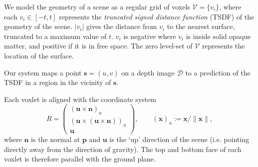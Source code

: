 \documentclass[10pt,twocolumn,letterpaper]{article}
\makeatletter
\renewcommand*{\ie}{i.e.\@\xspace}
\newcommand{\rgbdimage}{\mathcal{D}}
\newcommand{\intrinsics}{K}
\newcommand{\pixelidx}{\mathbf{s}}
\newcommand{\voxelgrid}{\mathcal{V}}
\newcommand{\voxel}{v}
\newcommand{\voxidx}{i}
\newcommand{\voxelidxs}{m, n, l}
\newcommand{\point}{\mathbf{p}}
\newcommand{\normal}{\mathbf{n}}
\newcommand{\updir}{\mathbf{u}}
\newcommand{\trans}{T}
\newcommand{\extrinsics}{H}
\newcommand{\voxelgridtoworld}{\trans_{\voxelgrid \rightarrow w}}
\makeatother
\begin{document}
We model the geometry of a scene as a regular grid of voxels $\voxelgrid = \{\voxel_\voxidx\}$, where each $\voxel_\voxidx \in [-t, t]$ represents the \emph{truncated signed distance function} (TSDF) of the geometry of the scene. $|\voxel_\voxidx|$ gives the distance from $\voxel_\voxidx$ to the nearest surface, truncated to a maximum value of $t$. $\voxel_\voxidx$ is negative where $\voxel_\voxidx$ is inside solid opaque matter, and positive if it is in free space. The zero level-set of $\voxelgrid$ represents the location of the surface.

Our system maps a point $\pixelidx = (u, v)$ on a depth image $\rgbdimage$ to a prediction of the TSDF in a region in the vicinity of $\pixelidx$.


Each voxlet is aligned with the coordinate system
\begin{equation}
  R = 
  \left( \begin{array}{ccc}
  (\updir \times \normal)_{u} \\
  (\updir \times (\updir \times \normal)  )_{u} \\
  \updir 
  \end{array}\right), \qquad
  (\mathbf{x})_{u} := \mathbf{x} / \| \mathbf{x} \|,
\end{equation}
where $\normal$ is the normal at $\point$ and $\updir$ is the `up' direction of the scene (\ie pointing directly away from the direction of gravity).
The top and bottom face of each voxlet is therefore parallel with the ground plane.





\end{document}
